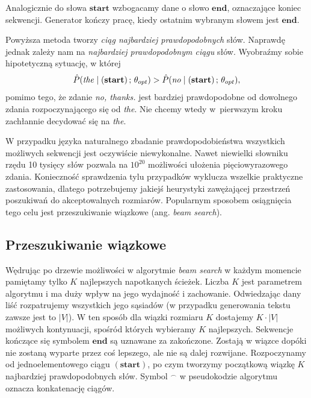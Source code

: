 Analogicznie do słowa $\mathbf{start}$ wzbogacamy dane o słowo $\mathbf{end}$, oznaczające koniec sekwencji. Generator kończy pracę, kiedy ostatnim wybranym słowem jest $\mathbf{end}$.

Powyższa metoda tworzy \textit{ciąg najbardziej prawdopodobnych} słów. Naprawdę jednak zależy nam na \textit{najbardziej prawdopodobnym ciągu} słów. Wyobraźmy sobie hipotetyczną sytuację, w której
\[\hat{P}(\text{\textit{the}} \mid (\mathbf{start})\, ;\, \theta_{opt}) > \hat{P}(\text{\textit{no}} \mid (\mathbf{start})\, ;\, \theta_{opt}),\]
pomimo tego, że zdanie \textit{no, thanks.} jest bardziej prawdopodobne od dowolnego zdania rozpoczynającego się od \textit{the}. Nie chcemy wtedy w~pierwszym kroku zachłannie decydować się na \textit{the}.

W przypadku języka naturalnego zbadanie prawdopodobieństwa wszystkich możliwych sekwencji jest oczywiście niewykonalne. Nawet niewielki słowniku rzędu 10 tysięcy słów pozwala na $10^{20}$ możliwości ułożenia pięciowyrazowego zdania. Konieczność sprawdzenia tylu przypadków wyklucza wszelkie praktyczne zastosowania, dlatego potrzebujemy jakiejś heurystyki zawężającej przestrzeń poszukiwań do akceptowalnych rozmiarów. Popularnym sposobem osiągnięcia tego celu jest przeszukiwanie wiązkowe (ang. \textit{beam search}).


\subsection{Przeszukiwanie wiązkowe} \label{beamsearch}
Wędrując po drzewie możliwości w algorytmie \textit{beam search} w każdym momencie pamiętamy tylko $K$ najlepszych napotkanych ścieżek. Liczba $K$ jest parametrem algorytmu i ma duży wpływ na jego wydajność i zachowanie. Odwiedzając dany liść rozpatrujemy wszystkich jego sąsiadów (w przypadku generowania tekstu zawsze jest to $|V|$). W ten sposób dla wiązki rozmiaru $K$ dostajemy $K \cdot |V|$ możliwych kontynuacji, spośród których wybieramy $K$ najlepszych. Sekwencje kończące się symbolem $\mathbf{end}$ są uznawane za zakończone. Zostają w wiązce dopóki nie zostaną wyparte przez coś lepszego, ale nie są dalej rozwijane. Rozpoczynamy od jednoelementowego ciągu $(\mathbf{start})$, po czym tworzymy początkową wiązkę $K$ najbardziej prawdopodobnych słów. Symbol $^\frown$ w pseudokodzie algorytmu oznacza konkatenację ciągów.

